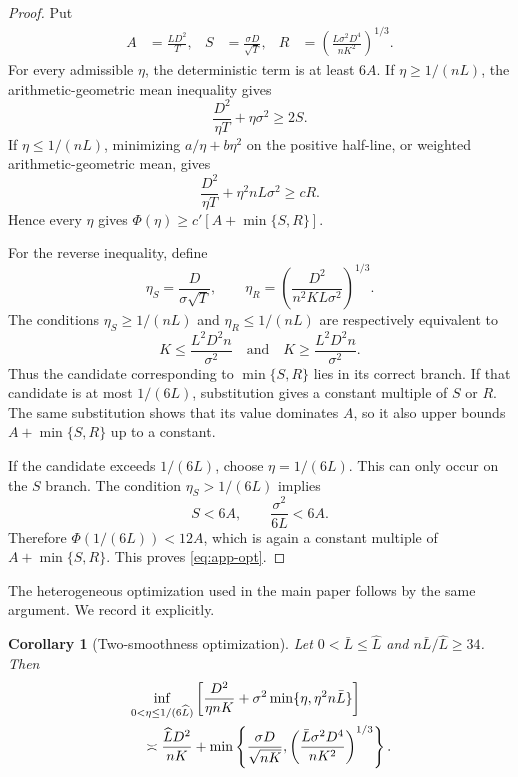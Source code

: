 \documentclass[twoside]{article}
\newtheorem{corollary}[theorem]{Corollary}
\begin{document}
\begin{proof}
Put
\begin{align*}
 A&=\frac{LD^2}{T},
 &S&=\frac{\sigma D}{\sqrt T},
 &R&=\left(\frac{L\sigma^2D^4}{nK^2}\right)^{1/3}.
\end{align*}
For every admissible $\eta$, the deterministic term is at least $6A$.
If $\eta\ge1/(nL)$, the arithmetic-geometric mean inequality gives
\begin{equation}
 \frac{D^2}{\eta T}+\eta\sigma^2\ge2S.
\end{equation}
If $\eta\le1/(nL)$, minimizing $a/\eta+b\eta^2$ on the positive half-line,
or weighted arithmetic-geometric mean, gives
\begin{equation}
 \frac{D^2}{\eta T}+\eta^2nL\sigma^2\ge cR.
\end{equation}
Hence every $\eta$ gives
$\Phi(\eta)\ge c'[A+\min\{S,R\}]$.

For the reverse inequality, define
\begin{equation}
 \eta_S=\frac{D}{\sigma\sqrt T},
 \qquad
 \eta_R=\left(\frac{D^2}{n^2KL\sigma^2}\right)^{1/3}.
\end{equation}
The conditions $\eta_S\ge1/(nL)$ and
$\eta_R\le1/(nL)$ are respectively equivalent to
\begin{equation}
 K\le\frac{L^2D^2n}{\sigma^2}
 \quad\text{and}\quad
 K\ge\frac{L^2D^2n}{\sigma^2}.
\end{equation}
Thus the candidate corresponding to $\min\{S,R\}$ lies in its correct branch.
If that candidate is at most $1/(6L)$, substitution gives a constant multiple
of $S$ or $R$. The same substitution shows that its value dominates $A$, so
it also upper bounds $A+\min\{S,R\}$ up to a constant.

If the candidate exceeds $1/(6L)$, choose $\eta=1/(6L)$. This can only occur
on the $S$ branch. The condition $\eta_S>1/(6L)$ implies
\begin{equation}
 S<6A,
 \qquad \frac{\sigma^2}{6L}<6A.
\end{equation}
Therefore $\Phi(1/(6L))<12A$, which is again a constant multiple of
$A+\min\{S,R\}$. This proves \eqref{eq:app-opt}.
\end{proof}

The heterogeneous optimization used in the main paper follows by the same
argument. We record it explicitly.

\begin{corollary}[Two-smoothness optimization]
\label{cor:app-opt-hetero}
Let $0<\bar L\le\widehat L$ and
$n\bar L/\widehat L\ge34$. Then
\begin{align}
 &\inf_{0<\eta\le1/(6\widehat L)}
 \left[\frac{D^2}{\eta nK}
 +\sigma^2\min\{\eta,\eta^2n\bar L\}\right]\notag\\
 &\quad\asymp\frac{\widehat LD^2}{nK}
 +\min\left\{\frac{\sigma D}{\sqrt{nK}},
 \left(\frac{\bar L\sigma^2D^4}{nK^2}\right)^{1/3}\right\}.
 \label{eq:app-opt-hetero}
\end{align}
\end{corollary}
\end{document}
